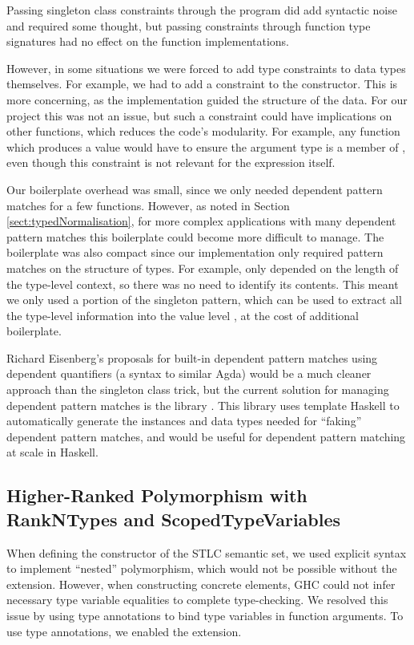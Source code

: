 Passing singleton class constraints through the program did add syntactic noise and required some thought, but passing constraints through function type signatures had no effect on the function implementations. 

However, in some situations we were forced to add type constraints to data types themselves. For example, we had to add a  constraint to the  constructor. This is more concerning, as the implementation guided the structure of the data. For our project this was not an issue, but such a constraint could have implications on other functions, which reduces the code's modularity. For example, any function which produces a  value would have to ensure the argument type is a member of , even though this constraint is not relevant for the expression itself.

Our boilerplate overhead was small, since we only needed dependent pattern matches for a few functions. However, as noted in Section \ref{sect:typedNormalisation}, for more complex applications with many dependent pattern matches this boilerplate could become more difficult to manage. The boilerplate was also compact since our implementation only required pattern matches on the structure of types. For example,  only depended on the length of the type-level context, so there was no need to identify its contents. This meant we only used a portion of the singleton pattern, which can be used to extract all the type-level information into the value level \cite{singletons}, at the cost of additional boilerplate.

Richard Eisenberg's proposals for built-in dependent pattern matches using dependent quantifiers \cite{GADTs} (a syntax to similar Agda) would be a much cleaner approach than the singleton class trick, but the current solution for managing dependent pattern matches is the  library \cite{singletonLibrary}. This library uses template Haskell to automatically generate the instances and data types needed for “faking” dependent pattern matches, and would be useful for dependent pattern matching at scale in Haskell.

\subsection{Higher-Ranked Polymorphism with RankNTypes and ScopedTypeVariables}
\label{subsect:rankNTypes}

When defining the  constructor of the STLC semantic set, we used explicit  syntax to implement “nested” polymorphism, which would not be possible without the  extension. However, when constructing concrete  elements, GHC could not infer necessary type variable equalities to complete type-checking. We resolved this issue by using type annotations to bind type variables in function arguments. To use type annotations, we enabled the  extension.

